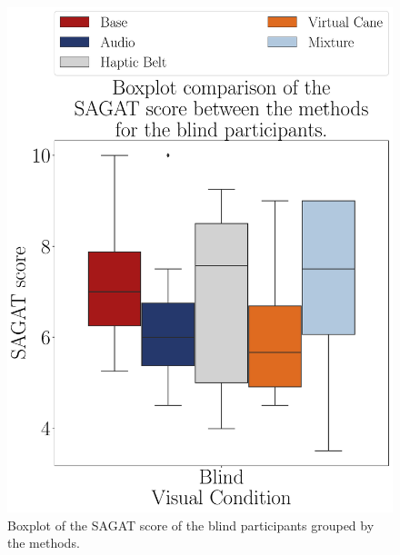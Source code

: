 \begin{figure}[!htb]
    \centering
    \begin{minipage}{0.45\textwidth}
        \centering
        \includegraphics[width = \textwidth]{Resultados/Sagat/Figuras/pdf/boxplot_sagat_blind_scene.pdf}
        \caption{Boxplot of the SAGAT score of the blind participants grouped by the methods.}
        \label{fig:boxplot_sagat_blind_scene}
    \end{minipage}
    \begin{minipage}{0.075\textwidth}
        \hfill
    \end{minipage}
    \begin{minipage}{0.45\textwidth}
        \centering

\end{minipage}
\end{figure}
